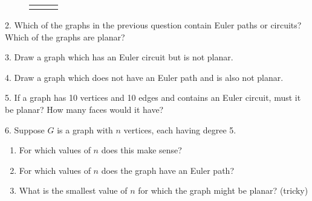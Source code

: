 \documentclass[10pt,]{book}
\theoremstyle{plain}
\theoremstyle{definition}
\numberwithin{equation}{chapter}
\newlength{\panelmax}
\begin{document}
\begin{exerciselist}
{\setlength{\panelmax}{\maxof{\panelmax}{\phBGimage}}
\leavevmode%
\setlength{\tabcolsep}{0.04\textwidth}
\begin{figure}
\hspace*{0.04\textwidth}%
\begin{tabular}{@{}*{3}{c}@{}}
\begin{minipage}[c][\panelmax][b]{0.28\textwidth}\usebox{\panelboxBEimage}\end{minipage}&
\begin{minipage}[c][\panelmax][b]{0.28\textwidth}\usebox{\panelboxBFimage}\end{minipage}&
\begin{minipage}[c][\panelmax][b]{0.2\textwidth}\usebox{\panelboxBGimage}\end{minipage}\end{tabular}
\end{figure}
}%
\par\smallskip
\item[2.]\hypertarget{exercise-321}{}
            Which of the graphs in the previous question contain Euler paths or circuits? Which of the graphs are planar?
\par\smallskip
\item[3.]\hypertarget{exercise-322}{}
            Draw a graph which has an Euler circuit but is not planar.
\par\smallskip
\item[4.]\hypertarget{exercise-323}{}
            Draw a graph which does not have an Euler path and is also not planar.
\par\smallskip
\item[5.]\hypertarget{exercise-324}{}
      If a graph has 10 vertices and 10 edges and contains an Euler circuit, must it be planar? How many faces would it have?
\par\smallskip
\item[6.]\hypertarget{exercise-325}{}
            Suppose \(G\) is a graph with \(n\) vertices, each having degree 5.
          \leavevmode%
\begin{enumerate}[label=(\alph*)]
\item\hypertarget{li-822}{}
                For which values of \(n\) does this make sense?
\item\hypertarget{li-823}{}
                For which values of \(n\) does the graph have an Euler path?
\item\hypertarget{li-824}{}
                What is the smallest value of \(n\) for which the graph might be planar? (tricky)
\end{enumerate}


\end{exerciselist}
\end{document}
